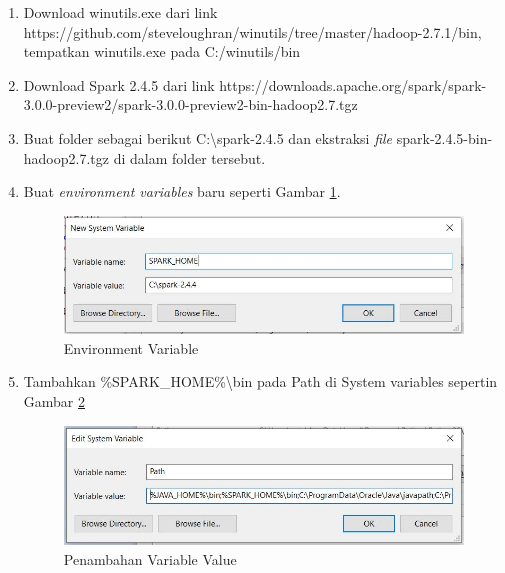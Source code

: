 \documentclass[a4paper,twoside]{article}
\begin{document}
\begin{enumerate}
\begin{enumerate}
\item Download winutils.exe dari link \textsf{https://github.com/steveloughran/winutils/tree/master/hadoop-2.7.1/bin}, tempatkan winutils.exe pada \textsf{C:/winutils/bin}

\item Download Spark 2.4.5 dari link \textsf{https://downloads.apache.org/spark/spark-3.0.0-preview2/spark-3.0.0-preview2-bin-hadoop2.7.tgz}

\item Buat folder sebagai berikut \textsf{C:\textbackslash spark-2.4.5} dan ekstraksi \textit{file} \textsf{spark-2.4.5-bin-hadoop2.7.tgz} di dalam folder tersebut.

\item Buat \textit{environment variables} baru seperti Gambar \ref{fig:spark_instal_3}.

\begin{figure}[H]
	\centering
	\includegraphics[scale=0.75]{spark_instal_3}
	\caption{Environment Variable}
	\label{fig:spark_instal_3}
\end{figure}

\item Tambahkan \textsf{\%SPARK\_HOME\%\textbackslash bin} pada Path di System variables sepertin Gambar \ref{fig:spark_instal_5}

\begin{figure}[H]
	\centering
	\includegraphics[scale=0.75]{spark_instal_5}
	\caption{Penambahan Variable Value}
	\label{fig:spark_instal_5}
\end{figure}

\end{enumerate}


\end{enumerate}
\end{document}
